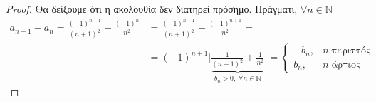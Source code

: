 \documentclass[main.tex]{subfiles}
\begin{document}
\begin{examples}
\begin{enumerate}[i)]
                \begin{proof}
                \item {}
                    Θα δείξουμε ότι η ακολουθία δεν διατηρεί πρόσημο. Πράγματι, 
                    $ \forall n \in \mathbb{N} $
                    \begin{align*}
                        a_{n+1}- a_{n} = \frac{(-1)^{n+1}}{(n+1)^{2}} - 
                        \frac{(-1)^{n}} {n^{2}} 
                        &= \frac{(-1)^{n+1}}{(n+1)^{2}} + 
                        \frac{(-1)^{n+1}}{n^{2}}= \\
                        &= (-1)^{n+1}\Biggl[\underbrace{\frac{1}{(n+1)^{2}} + 
                                \frac{1}{n^{2}}}_{b_{n} > 0, \; \forall n \in 
                        \mathbb{N}}\Biggr] 
                        = \begin{cases}
                            -b_{n}, & n \; \text{περιττός} \\
                            b_{n}, & n \; \text{άρτιος} 
                        \end{cases}
                    \end{align*} 
                \end{proof}
    \end{enumerate}
\end{examples}

\end{document}
